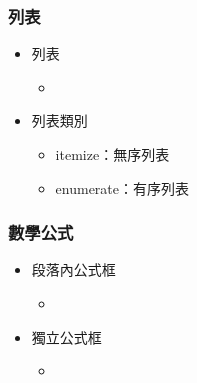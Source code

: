 \documentclass[mathserif]{beamer}
\begin{document}
\begin{frame}
    \frametitle{列表}
    \begin{itemize}
        \item 列表
            \begin{itemize}
                \item {}

            \end{itemize}
        \item 列表類別
            \begin{itemize}
                \item itemize：無序列表
                \item enumerate：有序列表
            \end{itemize}
    \end{itemize}
\end{frame}

\begin{frame}
    \frametitle{數學公式}
    \begin{itemize}
        \item 段落內公式框
            \begin{itemize}
                \item {\color{red}{\$你的公式\$}}
            \end{itemize}
        \item 獨立公式框
            \begin{itemize}
                \item {}
            \end{itemize}
    \end{itemize}
\end{frame}
\end{document}
